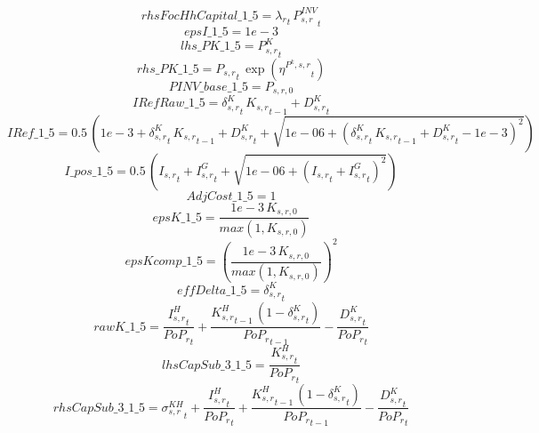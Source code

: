 \begin{dmath*}
rhsFocHhCapital\_1\_5 = {\lambda_r}_{t}\, {{P^{INV}_{s,r}}}_{t}
\end{dmath*}
\begin{dmath*}
epsI\_1\_5 = 1e-3
\end{dmath*}
\begin{dmath*}
lhs\_PK\_1\_5 = {{P^K_{s,r}}}_{t}
\end{dmath*}
\begin{dmath*}
rhs\_PK\_1\_5 = {{P_{s,r}}}_{t}\, \exp\left({{\eta^{P^k,s,r}}}_{t}\right)
\end{dmath*}
\begin{dmath*}
PINV\_base\_1\_5 = {{P_{s,r,0}}}
\end{dmath*}
\begin{dmath*}
IRefRaw\_1\_5 = {{\delta^{K}_{s,r}}}_{t}\, {{K_{s,r}}}_{t-1}+{{D^K_{s,r}}}_{t}
\end{dmath*}
\begin{dmath*}
IRef\_1\_5 = 0.5\, \left(1e-3+{{\delta^{K}_{s,r}}}_{t}\, {{K_{s,r}}}_{t-1}+{{D^K_{s,r}}}_{t}+\sqrt{1e-06+\left({{\delta^{K}_{s,r}}}_{t}\, {{K_{s,r}}}_{t-1}+{{D^K_{s,r}}}_{t}-1e-3\right)^{2}}\right)
\end{dmath*}
\begin{dmath*}
I\_pos\_1\_5 = 0.5\, \left({{I_{s,r}}}_{t}+{{I^G_{s,r}}}_{t}+\sqrt{1e-06+\left({{I_{s,r}}}_{t}+{{I^G_{s,r}}}_{t}\right)^{2}}\right)
\end{dmath*}
\begin{dmath*}
AdjCost\_1\_5 = 1
\end{dmath*}
\begin{dmath*}
epsK\_1\_5 = \frac{1e-3\, {{K_{s,r,0}}}}{max(1,{{K_{s,r,0}}})}
\end{dmath*}
\begin{dmath*}
epsKcomp\_1\_5 = \left(\frac{1e-3\, {{K_{s,r,0}}}}{max(1,{{K_{s,r,0}}})}\right)^{2}
\end{dmath*}
\begin{dmath*}
effDelta\_1\_5 = {{\delta^{K}_{s,r}}}_{t}
\end{dmath*}
\begin{dmath*}
rawK\_1\_5 = \frac{{{I^H_{s,r}}}_{t}}{{{PoP_r}}_{t}}+\frac{{{K^H_{s,r}}}_{t-1}\, \left(1-{{\delta^{K}_{s,r}}}_{t}\right)}{{{PoP_r}}_{t-1}}-\frac{{{D^K_{s,r}}}_{t}}{{{PoP_r}}_{t}}
\end{dmath*}
\begin{dmath*}
lhsCapSub\_3\_1\_5 = \frac{{{K^H_{s,r}}}_{t}}{{{PoP_r}}_{t}}
\end{dmath*}
\begin{dmath*}
rhsCapSub\_3\_1\_5 = {{\sigma^{KH}_{s,r}}}_{t}+\frac{{{I^H_{s,r}}}_{t}}{{{PoP_r}}_{t}}+\frac{{{K^H_{s,r}}}_{t-1}\, \left(1-{{\delta^{K}_{s,r}}}_{t}\right)}{{{PoP_r}}_{t-1}}-\frac{{{D^K_{s,r}}}_{t}}{{{PoP_r}}_{t}}
\end{dmath*}
